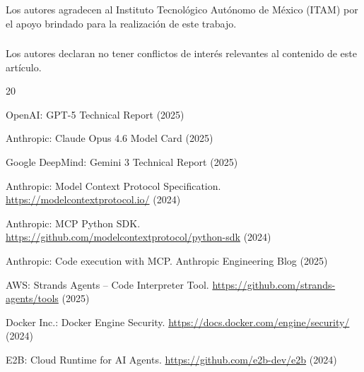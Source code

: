 \documentclass[runningheads]{llncs}
\begin{document}
%
\begin{credits}
\subsubsection{\ackname}
Los autores agradecen al Instituto Tecnol\'ogico Aut\'onomo de M\'exico (ITAM)
por el apoyo brindado para la realizaci\'on de este trabajo.

\subsubsection{\discintname}
Los autores declaran no tener conflictos de inter\'es relevantes al contenido
de este art\'iculo.
\end{credits}
%

%
\begin{thebibliography}{20}

OpenAI: GPT-5 Technical Report (2025)

Anthropic: Claude Opus 4.6 Model Card (2025)

Google DeepMind: Gemini 3 Technical Report (2025)

Anthropic: Model Context Protocol Specification.
\url{https://modelcontextprotocol.io/} (2024)

Anthropic: MCP Python SDK.
\url{https://github.com/modelcontextprotocol/python-sdk} (2024)

Anthropic: Code execution with MCP. Anthropic Engineering Blog (2025)

AWS: Strands Agents -- Code Interpreter Tool.
\url{https://github.com/strands-agents/tools} (2025)

Docker Inc.: Docker Engine Security.
\url{https://docs.docker.com/engine/security/} (2024)

E2B: Cloud Runtime for AI Agents.
\url{https://github.com/e2b-dev/e2b} (2024)


\end{thebibliography}
%
\end{document}
